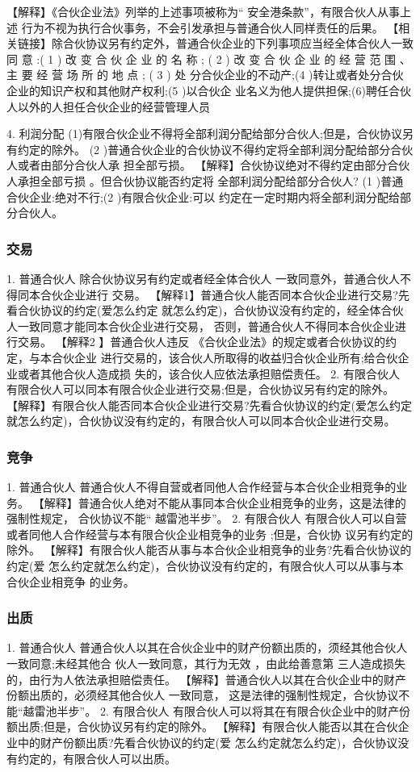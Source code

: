 \documentclass[UTF8,12pt]{ctexart}
\numberwithin{equation}{section} %
\numberwithin{figure}{section}
\numberwithin{table}{section}
\begin{document}
	【解释】《合伙企业法》列举的上述事项被称为“ 安全港条款”，有限合伙人从事上述 行为不视为执行合伙事务，不会引发承担与普通合伙人同样责任的后果。
	【相关链接】除合伙协议另有约定外，普通合伙企业的下列事项应当经全体合伙人一致同 意 :( 1 ) 改 变 合 伙 企 业 的 名 称 ; ( 2 ) 改 变 合 伙 企 业 的 经 营 范 围 、 主 要 经 营 场 所 的 地 点 ; ( 3 ) 处 分合伙企业的不动产;(4 )转让或者处分合伙企业的知识产权和其他财产权利;(5 )以合伙企 业名义为他人提供担保;(6)聘任合伙人以外的人担任合伙企业的经营管理人员
	
	4. 利润分配 (1)有限合伙企业不得将全部利润分配给部分合伙人;但是，合伙协议另有约定的除外。 (2 )普通合伙企业的合伙协议不得约定将全部利润分配给部分合伙人或者由部分合伙人承 担全部亏损。
	【解释】合伙协议绝对不得约定由部分合伙人承担全部亏损 。但合伙协议能否约定将 全部利润分配给部分合伙人? (1 )普通合伙企业:绝对不行;(2 )有限合伙企业:可以 约定在一定时期内将全部利润分配给部分合伙人。
	
	
	\subsubsection{交易}
	1. 普通合伙人
	除合伙协议另有约定或者经全体合伙人 一致同意外，普通合伙人不得同本合伙企业进行 交易。
	【解释1】普通合伙人能否同本合伙企业进行交易?先看合伙协议的约定(爱怎么约定 就怎么约定)，合伙协议没有约定的，经全体合伙人一致同意才能同本合伙企业进行交易， 否则，普通合伙人不得同本合伙企业进行交易。
	【解释2 】普通合伙人违反 《合伙企业法》的规定或者合伙协议的约定，与本合伙企业 进行交易的，该合伙人所取得的收益归合伙企业所有;给合伙企业或者其他合伙人造成损 失的，该合伙人应依法承担赔偿责任。
	2. 有限合伙人 有限合伙人可以同本有限合伙企业进行交易;但是，合伙协议另有约定的除外。
	【解释】有限合伙人能否同本合伙企业进行交易?先看合伙协议的约定(爱怎么约定 就怎么约定)，合伙协议没有约定的，有限合伙人可以同本合伙企业进行交易。
	
	
	\subsubsection{竞争}
	1. 普通合伙人 普通合伙人不得自营或者同他人合作经营与本合伙企业相竞争的业务。
	【解释】普通合伙人绝对不能从事同本合伙企业相竞争的业务，这是法律的强制性规定， 合伙协议不能“ 越雷池半步”。
	2. 有限合伙人
	有限合伙人可以自营或者同他人合作经营与本有限合伙企业相竞争的业务 ;但是，合伙协 议另有约定的除外。
	【解释】有限合伙人能否从事与本合伙企业相竞争的业务?先看合伙协议的约定(爱 怎么约定就怎么约定)，合伙协议没有约定的，有限合伙人可以从事与本合伙企业相竞争 的业务。
	
	
	\subsubsection{出质}
	1. 普通合伙人
	普通合伙人以其在合伙企业中的财产份额出质的，须经其他合伙人 一致同意;未经其他合 伙人一致同意，其行为无效 ，由此给善意第 三人造成损失的，由行为人依法承担赔偿责任。 【解释】普通合伙人以其在合伙企业中的财产份额出质的，必须经其他合伙人 一致同意， 这是法律的强制性规定，合伙协议不能“越雷池半步”。
	2. 有限合伙人 有限合伙人可以将其在有限合伙企业中的财产份额出质;但是，合伙协议另有约定的除外。
	【解释】有限合伙人能否以其在合伙企业中的财产份额出质?先看合伙协议的约定(爱 怎么约定就怎么约定)，合伙协议没有约定的，有限合伙人可以出质。
	
\end{document}
